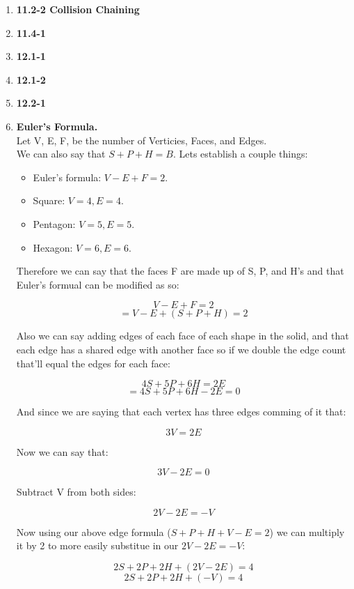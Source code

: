 \documentclass{article}
\begin{document}
\begin{enumerate}
    \item \textbf{11.2-2 Collision Chaining} \\
    
    
    \item \textbf{11.4-1}
    \item \textbf{12.1-1}
    \item \textbf{12.1-2}
    \item \textbf{12.2-1}
    \item \textbf{Euler's Formula.} \\
    
    Let V, E, F, be the number of Verticies, Faces, and Edges. \\
    We can also say that $S + P + H = B$.
    Lets establish a couple things: 
    \begin{itemize}
        \item Euler's formula: $V - E + F = 2$.
        \item Square: $V = 4, E = 4$.
        \item Pentagon: $V = 5, E = 5$.
        \item Hexagon: $V = 6, E = 6$.
    \end{itemize}

    Therefore we can say that the faces F are made up of S, P, and H's and that Euler's formual can be modified as so:

    \[V - E + F = 2\]
    \[= V - E + (S + P + H) = 2\]

    Also we can say adding edges of each face of each shape in the solid, and that each edge has a shared edge with another face so if we double the edge count that'll equal the edges for each face:

    \[4S + 5P + 6H = 2E\]
    \[= 4S + 5P + 6H - 2E = 0\]
    
    And since we are saying that each vertex has three edges comming of it that:

    \[3V = 2E\]

    Now we can say that:

    \[3V - 2E = 0\]

    Subtract V from both sides:

    \[2V - 2E = -V\]

    Now using our above edge formula ($S + P + H + V - E = 2$) we can multiply it by 2 to more easily substitue in our $2V - 2E = -V$:

    \[2S + 2P + 2H + (2V - 2E) = 4\]
    \[2S + 2P + 2H + (-V) = 4\]


\end{enumerate}
\end{document}
